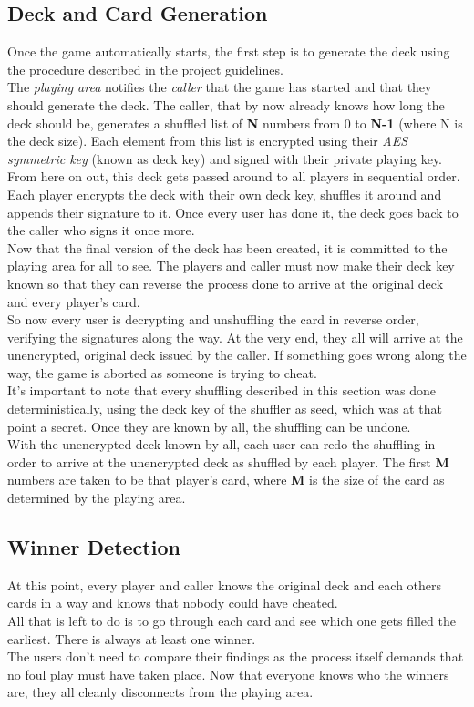 \documentclass[11pt]{article}
\begin{document}
\subsection{Deck and Card Generation}
Once the game automatically starts, the first step is to generate the deck using the procedure described in the project guidelines.\\
The \emph{playing area} notifies the \emph{caller} that the game has started and that they should generate the deck. The caller, that by now already knows how long the deck should be, generates a shuffled list of \textbf{N} numbers from 0 to \textbf{N-1} (where N is the deck size). Each element from this list is encrypted using their \emph{AES symmetric key} (known as deck key) and signed with their private playing key. \\
From here on out, this deck gets passed around to all players in sequential order. Each player encrypts the deck with their own deck key, shuffles it around and appends their signature to it. Once every user has done it, the deck goes back to the caller who signs it once more. \\
Now that the final version of the deck has been created, it is committed to the playing area for all to see. The players and caller must now make their deck key known so that they can reverse the process done to arrive at the original deck and every player’s card. \\
So now every user is decrypting and unshuffling the card in reverse order, verifying the signatures along the way. At the very end, they all will arrive at the unencrypted, original deck issued by the caller. If something goes wrong along the way, the game is aborted as someone is trying to cheat. \\
It’s important to note that every shuffling described in this section was done deterministically, using the deck key of the shuffler as seed, which was at that point a secret. Once they are known by all, the shuffling can be undone.\\
With the unencrypted deck known by all, each user can redo the shuffling in order to arrive at the unencrypted deck as shuffled by each player. The first \textbf{M} numbers are taken to be that player’s card, where \textbf{M} is the size of the card as determined by the playing area.

\subsection{Winner Detection}
At this point, every player and caller knows the original deck and each others cards in a way and knows that nobody could have cheated. \\
All that is left to do is to go through each card and see which one gets filled the earliest. There is always at least one winner. \\
The users don’t need to compare their findings as the process itself demands that no foul play must have taken place. Now that everyone knows who the winners are, they all cleanly disconnects from the playing area.
\end{document}
